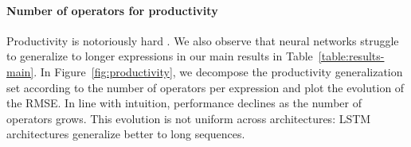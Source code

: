 \paragraph{Number of operators for productivity} Productivity is notoriously hard \parencite{kim_20, hupkes_20, baroni_19}. We also observe that neural networks struggle to generalize to longer expressions in our main results in Table~\ref{table:results-main}. In Figure~\ref{fig:productivity}, we decompose the productivity generalization set according to the number of operators per expression and plot the evolution of the RMSE. In line with intuition, performance declines as the number of operators grows. This evolution is not uniform across architectures: LSTM architectures generalize better to long sequences. 

